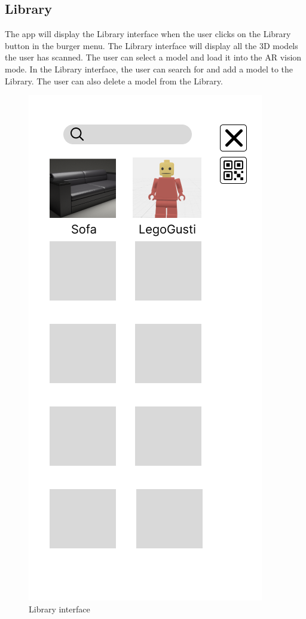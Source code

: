 \subsection{Library}
The app will display the Library interface when the user clicks on the Library button in the burger menu. The Library interface will display all the 3D models the user has scanned. The user can select a model and load it into the AR vision mode. In the Library interface, the user can search for and add a model to the Library. The user can also delete a model from the Library.
\begin{figure}[h!]
    \begin{center}
        \includegraphics[scale=0.5]{img/App_mock/iPhone 14 - 10.png}
        \caption{Library interface}
        \label{fig:library}
    \end{center}
\end{figure}
\pagebreak

